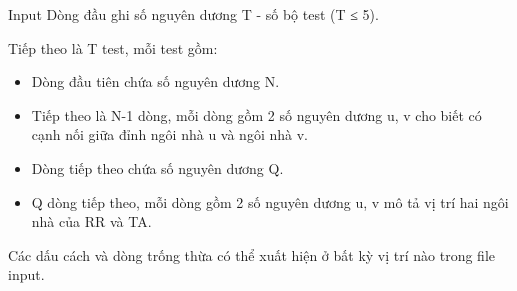 Input  
Dòng đầu ghi số nguyên dương T - số bộ test (T ≤ 5).  

   Tiếp theo là T test, mỗi test gồm:  
\begin{itemize}
	\item     Dòng đầu tiên chứa số nguyên dương N.   
	\item     Tiếp theo là N-1 dòng, mỗi dòng gồm 2 số nguyên dương u, v cho biết có cạnh nối giữa đỉnh ngôi nhà u và ngôi nhà v.   
	\item     Dòng tiếp theo chứa số nguyên dương Q.   
	\item     Q dòng tiếp theo, mỗi dòng gồm 2 số nguyên dương u, v mô tả vị trí hai ngôi nhà của RR và TA.   
\end{itemize}

   Các dấu cách và dòng trống thừa có thể xuất hiện ở bất kỳ vị trí nào trong file input.